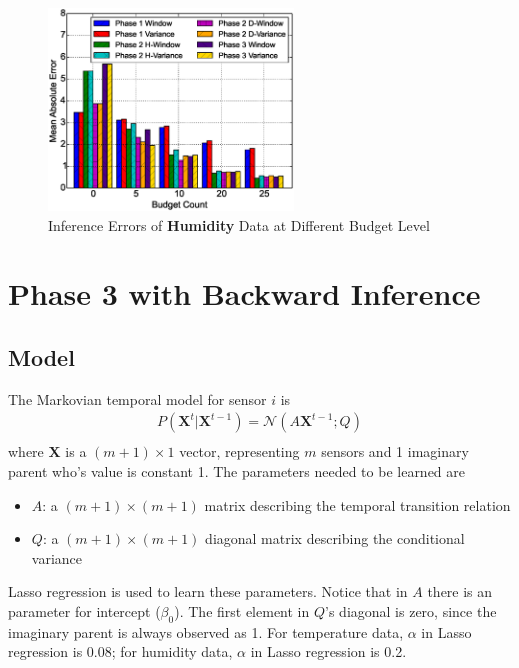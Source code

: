 \documentclass[12pt]{article}  %
\theoremstyle{definition}
\theoremstyle{remark}
\begin{document}
\begin{figure}[H]
\centering
        \includegraphics[width=0.58\textwidth]{../phase3/humidity_err}
        \caption{Inference Errors of \textbf{Humidity} Data at Different Budget Level}
\label{fig:phase3:humidity}
\end{figure}



\section{Phase 3 with Backward Inference}

\subsection{Model}
The Markovian temporal model for sensor $i$ is
\begin{align}
        P(\mathbf{X}^t | \mathbf{X}^{t-1}) = \mathcal{N}(A \mathbf{X}^{t-1}; Q) \\
\end{align}
where $\mathbf{X}$ is a $(m+1) \times 1$ vector, representing $m$ sensors and 1 imaginary parent
who's value is constant 1.
The parameters needed to be learned are
\begin{itemize}
        \item $A$: a $(m+1)\times (m+1)$ matrix describing the temporal transition relation
        \item $Q$: a $(m+1)\times (m+1)$ diagonal matrix describing the conditional variance
\end{itemize}
Lasso regression is used to learn these parameters.
Notice that in $A$ there is an parameter for intercept ($\beta_0$).
The first element in $Q$'s diagonal is zero, since the imaginary parent is always observed as 1.
For temperature data, $\alpha$ in Lasso regression is 0.08;
for humidity data, $\alpha$ in Lasso regression is 0.2.
\end{document}
